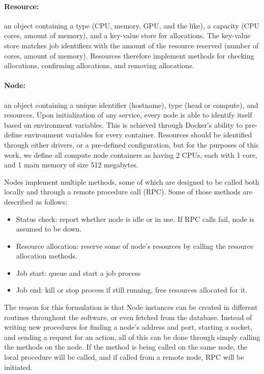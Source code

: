 \documentclass[sigconf]{acmart}
\begin{document}
\paragraph{Resource:} an object containing a type (CPU, memory, GPU, and the like), a capacity (CPU cores, amount of memory),
and a key-value store for allocations.
The key-value store matches job identifiers with the amount of the resource reserved (number of cores, amount of memory).
Resources therefore implement methods for checking allocations, confirming allocations, and removing allocations.

\paragraph{Node:} an object containing a unique identifier (hostname), type (head or compute), and resources.
Upon initialization of any service, every node is able to identify itself based on environment variables.
This is achieved through Docker's ability to pre-define environment variables for every container.
Resources should be identified through either drivers, or a pre-defined configuration, but for the purposes of this work, we
define all compute node containers as having 2 CPUs, each with 1 core, and 1 main memory of size 512 megabytes.

Nodes implement multiple methods, some of which are designed to be called both locally and through a remote procedure call (RPC).
Some of those methods are described as follows:
\begin{itemize}
    \item Status check: report whether node is idle or in use. If RPC calls fail, node is assumed to be down.
    \item Resource allocation: reserve some of node's resources by calling the resource allocation methods.
    \item Job start: queue and start a job process
    \item Job end: kill or stop process if still running, free resources allocated for it.
\end{itemize}

The reason for this formulation is that Node instances can be created in different routines throughout the software, or even
fetched from the database. Instead of writing new procedures for finding a node's address and port, starting a socket, and
sending a request for an action, all of this can be done through simply calling the methods on the node.
If the method is being called on the same node, the local procedure will be called, and if called from a remote node, RPC will
be initiated.
\end{document}

